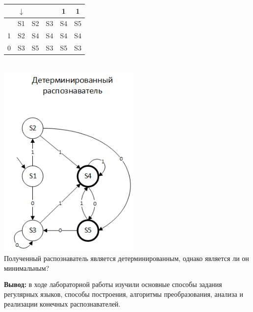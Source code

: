 \documentclass[a4paper,14pt]{extarticle}
\begin{document}
\begin{enumerate}[1.]
\begin{tabular}{|c|c|c|c|c|c|}
    \hline
    & $\downarrow$ & & & 1 & 1 \\
    \hline
    & S1 & S2 & S3 & S4 & S5 \\
    \hline
    1 & S2 & S4 & S4 & S4 & S4 \\
    \hline
    0 & S3 & S5  & S3 & S5 & S3 \\
    \hline
\end{tabular}\\
\includegraphics[width=70mm]{task3_determined}\\

Полученный распознаватель является детерминированным, однако является ли он 
минимальным? 


\end{enumerate}

\textbf{Вывод: } в ходе лабораторной работы изучили основные способы задания регулярных языков, 
способы построения, алгоритмы преобразования, анализа и реализации конечных 
распознавателей.
\end{document}
